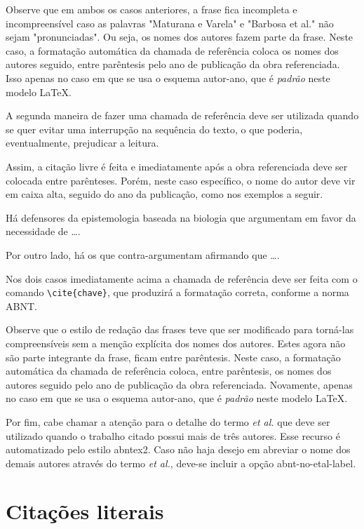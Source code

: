 \begin{apendicesenv}
Observe que em ambos os casos anteriores, a frase fica incompleta e
incompreensível caso as palavras "Maturana e Varela"{} e "Barbosa et al."{} não
sejam "pronunciadas"{}. Ou seja, os nomes dos autores fazem parte da frase.
Neste caso, a formatação automática da chamada de referência coloca os nomes dos
autores seguido, entre parêntesis pelo ano de publicação da obra referenciada.
Isso apenas no caso em que se usa o esquema autor-ano, que é \textit{padrão}
neste modelo \LaTeX{}.

A segunda maneira de fazer uma chamada de referência deve ser utilizada quando
se quer evitar uma interrupção na sequência do texto, o que poderia,
eventualmente, prejudicar a leitura.

Assim, a citação livre é feita e imediatamente após a obra referenciada deve ser
colocada entre parênteses. Porém, neste caso específico, o nome do autor deve
vir em caixa alta, seguido do ano da publicação, como nos exemplos a seguir.

Há defensores da epistemologia baseada na biologia que argumentam em favor da
necessidade de \ldots \cite{Maturana2003}.

Por outro lado, há os que contra-argumentam afirmando que \ldots \cite{Barbosa2004}.

Nos dois casos imediatamente acima a chamada de referência deve ser feita com o
comando \verb|\cite{chave}|, que produzirá a formatação correta, conforme a
norma ABNT.

Observe que o estilo de redação das frases teve que ser modificado para
torná-las compreensíveis sem a menção explícita dos nomes dos autores. Estes
agora não são parte integrante da frase, ficam entre parêntesis. Neste caso, a
formatação automática da chamada de referência coloca, entre parêntesis, os
nomes dos autores seguido pelo ano de publicação da obra referenciada.
Novamente, apenas no caso em que se usa o esquema autor-ano, que é
\textit{padrão} neste modelo \LaTeX{}.

Por fim, cabe chamar a atenção para o detalhe do termo \textit{et al.} que deve
ser utilizado quando o trabalho citado possui mais de três autores. Esse recurso
é automatizado pelo estilo {\ttfamily abntex2}. Caso não haja desejo em abreviar
o nome dos demais autores através do termo \textit{et al.}, deve-se incluir a
opção {\ttfamily abnt-no-etal-label}.

\section{Citações literais}
\label{sec:citacoesLiterais}


\end{apendicesenv}
